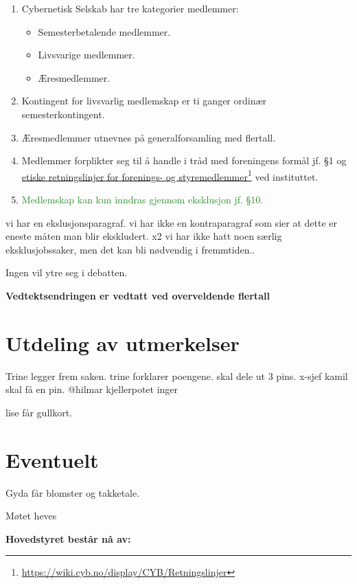 \documentclass[10pt,norsk,a4paper,usenames,dvipsnames]{article}
\newcommand\fhref[2]{%
	\href{#1}{#2}\footnote{\url{#1}}%
}
\begin{document}
    \begin{enumerate}
    	\item{Cybernetisk Selskab har tre kategorier medlemmer:}
    	\begin{itemize}
    		\item{Semesterbetalende medlemmer.}
    		\item{Livsvarige medlemmer.}
    		\item{Æresmedlemmer.}
    	\end{itemize}
    	\item{Kontingent for livsvarlig medlemskap er ti ganger ordinær semesterkontingent.}
    	\item{Æresmedlemmer utnevnes på generalforsamling med  flertall.}
    	\item Medlemmer forplikter seg til å handle i tråd med foreningens formål jf. §1 og \fhref{https://wiki.cyb.no/display/CYB/Retningslinjer}{etiske retningslinjer for forenings- og styremedlemmer} ved instituttet.
    	\item \textcolor{ForestGreen}{Medlemskap kan kun inndras gjennom eksklusjon jf. §10.}
    \end{enumerate}
        vi har en ekslusjonsparagraf. vi har ikke en kontraparagraf som sier at dette er eneste måten man blir ekskludert.
        x2 vi har ikke hatt noen særlig eksklusjobssaker, men det kan bli nødvendig i fremmtiden..
        
        Ingen vil ytre seg i debatten.
        
        \textbf{Vedtektsendringen er vedtatt ved overveldende flertall}

\section{Utdeling av utmerkelser}
Trine legger frem saken.
trine forklarer poengene.
skal dele ut 3 pins.
x-sjef kamil skal få en pin.
@hilmar
kjellerpotet inger

lise får gullkort.


\section{Eventuelt}
Gyda får blomster og takketale.

Møtet heves


\newpage




\textbf{\huge{Hovedstyret består nå av:}}

\mbox{}
\end{document}
